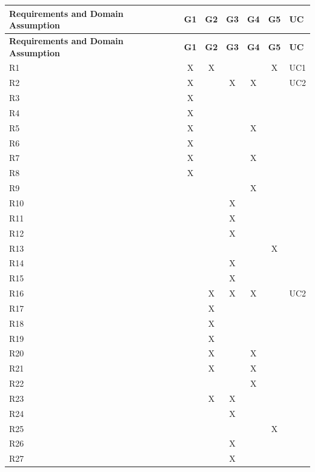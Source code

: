 \begin{longtable}{|l|c|c|c|c|c|l|}
\hline
\textbf{Requirements and Domain Assumption} & \textbf{G1} & \textbf{G2} & \textbf{G3} & \textbf{G4} & \textbf{G5} & \textbf{UC} \\
\hline
\endfirsthead
\hline
\textbf{Requirements and Domain Assumption} & \textbf{G1} & \textbf{G2} & \textbf{G3} & \textbf{G4} & \textbf{G5} & \textbf{UC} \\
\hline
\endhead
R1  & X & X &   &   & X & UC1  \\
\hline
R2  & X &   & X & X &   & UC2  \\
\hline
R3  & X &   &   &   &   &       \\
\hline
R4  & X &   &   &   &   &       \\
\hline
R5  & X &   &   & X &   &       \\
\hline
R6  & X &   &   &   &   &       \\
\hline
R7  & X &   &   & X &   &       \\
\hline
R8  & X &   &   &   &   &       \\
\hline
R9  &   &   &   & X &   &       \\
\hline
R10 &   &   & X &   &   &       \\
\hline
R11 &   &   & X &   &   &       \\
\hline
R12 &   &   & X &   &   &       \\
\hline
R13 &   &   &   &   & X &       \\
\hline
R14 &   &   & X &   &   &       \\
\hline
R15 &   &   & X &   &   &       \\
\hline
R16 &   & X & X & X &   & UC2   \\
\hline
R17 &   & X &   &   &   &       \\
\hline
R18 &   & X &   &   &   &       \\
\hline
R19 &   & X &   &   &   &       \\
\hline
R20 &   & X &   & X &   &       \\
\hline
R21 &   & X &   & X &   &       \\
\hline
R22 &   &   &   & X &   &       \\
\hline
R23 &   & X & X &   &   &       \\
\hline
R24 &   &   & X &   &   &       \\
\hline
R25 &   &   &   &   & X &       \\
\hline
R26 &   &   & X &   &   &       \\
\hline
R27 &   &   & X &   &   &       \\

\end{longtable}
